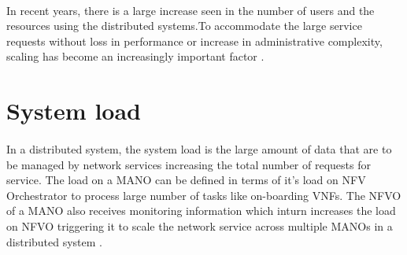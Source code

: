 \paragraph{}
In recent years, there is a large increase seen in the number of users and the resources using the distributed systems.To accommodate the large service requests without loss in performance or increase in administrative complexity, scaling has become an increasingly important factor \cite{ord1994scale}.


\section{System load}
\paragraph{}In a distributed system, the system load is the large amount of data that are to be managed by network services increasing the total number of requests for service.
The load on a MANO can be defined in terms of it's load on NFV Orchestrator to process large number of tasks like on-boarding VNFs. The NFVO of a MANO also receives monitoring information which inturn increases the load on NFVO triggering it to scale the network service across multiple MANOs in a distributed system \cite{soenen2017optimising}.
